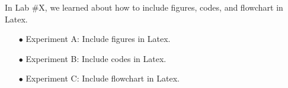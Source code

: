 \documentclass{LabReport}
\begin{document}
\makeCover

\setlength{\parskip}{0.2em} %
\fontsize{12}{1em} %
\setmainfont{Times New Roman} %
\justifying


\setlength{\parindent}{0em}
In Lab \#X, we learned about how to include figures, codes, and flowchart in Latex.
\setlength{\parindent}{1.5em}

\begin{itemize}[leftmargin=1em]
    \item [$\bullet$] Experiment A: Include figures in Latex.    
    \item [$\bullet$] Experiment B: Include codes in Latex.
    \item [$\bullet$] Experiment C: Include flowchart in Latex.
\end{itemize}






\end{document}
